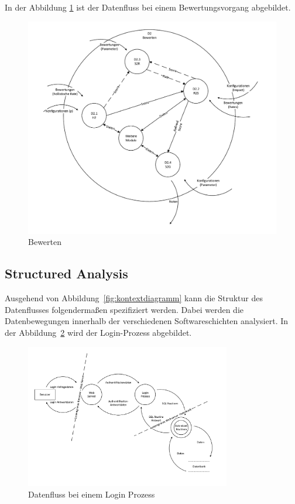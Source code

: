 \begin{appendix}
	In der Abbildung \ref{fig:Diagramm2} ist der Datenfluss bei einem Bewertungsvorgang abgebildet.
	\begin{figure}[H]
   \centering
   \includegraphics[width=\textwidth]{./img/dfd_diagramm2}
   \caption{Bewerten}
   \label{fig:Diagramm2}
   \end{figure}
 

  \clearpage
 \subsection{Structured Analysis} 
 
 Ausgehend von Abbildung~\ref{fig:kontextdiagramm} kann die Struktur des Datenflusses folgendermaßen spezifiziert werden. Dabei werden die Datenbewegungen innerhalb der verschiedenen Softwareschichten analysiert.
 In der Abbildung~\ref{fig:login} wird der Login-Prozess abgebildet.   
 
   \begin{figure}[ht]
  \centering
  \includegraphics[width=0.8\textwidth]{./img/dfd_login}
  \caption{Datenfluss bei einem Login Prozess}
  \label{fig:login}
  \end{figure}
  

\end{appendix}
